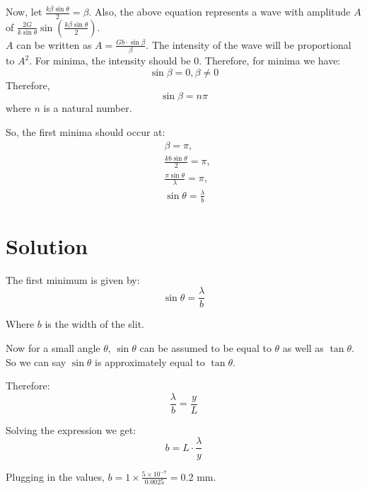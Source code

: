 \documentclass[journal,12pt,twocolumn]{IEEEtran}
\theoremstyle{remark}
\begin{document}
Now, let $\frac{k\beta\sin\theta}{2} = \beta$. Also, the above equation represents a wave with amplitude $A$ of $\frac{2G}{k\sin\theta}\sin\left(\frac{k\beta\sin\theta}{2}\right)$.\\


$A$ can be written as $A = \frac{Gb\cdot\sin\beta}{\beta}$.
The intensity of the wave will be proportional to $A^2$. For minima, the intensity should be $0$. Therefore, for minima we have:
$$
\sin\beta = 0,  \beta \neq 0
$$
Therefore, $$
\sin\beta = n\pi
$$
where \(n\) is a natural number.

So, the first minima should occur at:
\begin{align*}
&\beta = \pi,\\
&\frac{kb\sin\theta}{2} = \pi,\\
&\frac{\pi\sin\theta}{\lambda} = \pi,\\
&\sin\theta = \frac{\lambda}{b}
\end{align*}

\section{Solution}

The first minimum is given by:
\[
\sin\theta = \frac{\lambda}{b}
\]

Where \(b\) is the width of the slit.

Now for a small angle \(\theta\), \(\sin\theta\) can be assumed to be equal to \(\theta\) as well as \(\tan\theta\). So we can say \(\sin\theta\) is approximately equal to \(\tan\theta\).

Therefore:
\[
\frac{\lambda}{b} = \frac{y}{L}
\]

Solving the expression we get:
\[
b = L \cdot \frac{\lambda}{y}
\]

Plugging in the values, \(b = 1 \times \frac{5 \times 10^{-7}}{0.0025} = 0.2\) mm.
\end{document}
